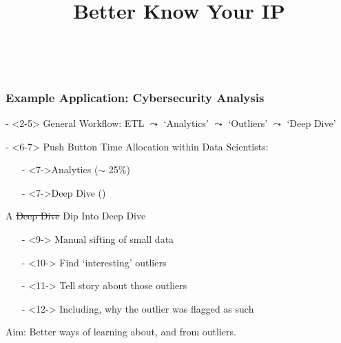 \documentclass[compress]{beamer}
\title[Better Know Your IP]{Better Know Your IP}
\author[]{\vspace{.15cm}\\}
\date[]{}
\begin{document}
\newenvironment{large_enum}{
\Large
\begin{itemize}
  \setlength{\itemsep}{7pt}
  \setlength{\parskip}{0pt}
  \setlength{\parsep}{0pt}
}{\end{itemize}}

\begin{comment}

setwd(paste0(githubdir, "know_your_ip/know_your_ip/presentation/"))
tools::texi2dvi("kip.tex", pdf = TRUE, clean = TRUE) 
setwd(basedir)

\end{comment}
 \frame
  {
    \titlepage
  }

\begin{frame}
\frametitle{Example Application: Cybersecurity Analysis}
\begin{large_enum}
\item[-]<2-5> General Workflow: ETL \pause \pause $\leadsto$ `Analytics' \pause $\leadsto$ `Outliers' \pause $\leadsto$ `Deep Dive'
\item[-]<6-7> Push Button Time Allocation within Data Scientists:
        \begin{itemize}
        \item[-]<7->Analytics ($\sim$ 25\%)
        \item[-]<7->Deep Dive (\color{red}{$\sim$ 75\%})
        \end{itemize}
\item[]<8-12> A {\color{red}\sout{Deep Dive}} Dip Into Deep Dive 
  \begin{itemize}
   \item[-]<9->  Manual sifting of small data 
   \item[-]<10-> Find `interesting' outliers 
   \item[-]<11-> Tell story about those outliers
   \item[-]<12-> Including, why the outlier was flagged as such 
  \end{itemize} 
\item[]<13-> Aim: Better ways of learning about, and from outliers.
\end{large_enum}
\end{frame}
\end{document}
